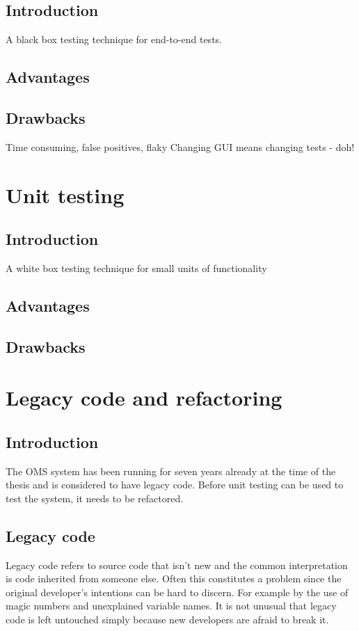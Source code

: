 \documentclass{article}
\begin{document}
		\subsection{Introduction}
		A black box testing technique for end-to-end tests. 
		\subsection{Advantages}
		\subsection{Drawbacks}
		Time consuming, false positives, flaky
		Changing GUI means changing tests - doh!

	\section{Unit testing}
		\subsection{Introduction}
		A white box testing technique for small units of functionality
		\subsection{Advantages}
		\subsection{Drawbacks}

	\section{Legacy code and refactoring}
		\subsection{Introduction}
		The OMS system has been running for seven years already at the time of the thesis and is considered to have legacy code. Before unit testing can be used to test the system, it needs to be refactored. 

		\subsection{Legacy code}
		Legacy code refers to source code that isn't new and the common interpretation is code inherited from someone else. Often this constitutes a problem since the original developer's intentions can be hard to discern. For example by the use of magic numbers and unexplained variable names. It is not unusual that legacy code is left untouched simply because new developers are afraid to break it.
\end{document}
